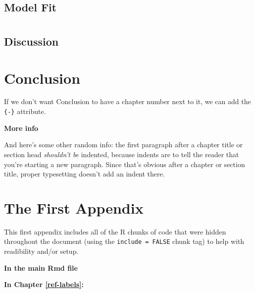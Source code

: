 \documentclass[12pt,twoside]{reedthesis}
\theoremstyle{definition}
\theoremstyle{definition}
\theoremstyle{definition}
\theoremstyle{remark}
\begin{document}
\section{Model Fit}\label{model-fit}

\chapter{}\label{section-5}

\section{Discussion}\label{discussion}

\chapter*{Conclusion}\label{conclusion}

If we don't want Conclusion to have a chapter number next to it, we can
add the \texttt{\{-\}} attribute.

\textbf{More info}

And here's some other random info: the first paragraph after a chapter
title or section head \emph{shouldn't be} indented, because indents are
to tell the reader that you're starting a new paragraph. Since that's
obvious after a chapter or section title, proper typesetting doesn't add
an indent there.

\appendix

\chapter{The First Appendix}\label{the-first-appendix}

This first appendix includes all of the R chunks of code that were
hidden throughout the document (using the \texttt{include\ =\ FALSE}
chunk tag) to help with readibility and/or setup.

\textbf{In the main Rmd file}
\begin{Shaded}
\begin{Highlighting}[]
\NormalTok{(}\OperatorTok{!}
  \NormalTok{(}\NormalTok{, } \NormalTok{)}
\NormalTok{(}\OperatorTok{!}
\OperatorTok{::}\NormalTok{(}\NormalTok{)}
\end{Highlighting}
\end{Shaded}
\textbf{In Chapter \ref{ref-labels}:}
\end{document}
